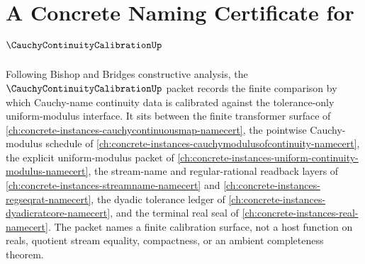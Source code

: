 \chapter{A Concrete Naming Certificate for $\CauchyContinuityCalibrationUp$}
\label{ch:concrete-instances-cauchy-continuity-calibration-namecert}

Following Bishop and Bridges constructive analysis, the $\CauchyContinuityCalibrationUp$ packet records the finite comparison by which Cauchy-name continuity data is calibrated against the tolerance-only uniform-modulus interface. It sits between the finite transformer surface of \autoref{ch:concrete-instances-cauchycontinuousmap-namecert}, the pointwise Cauchy-modulus schedule of \autoref{ch:concrete-instances-cauchymodulusofcontinuity-namecert}, the explicit uniform-modulus packet of \autoref{ch:concrete-instances-uniform-continuity-modulus-namecert}, the stream-name and regular-rational readback layers of \autoref{ch:concrete-instances-streamname-namecert} and \autoref{ch:concrete-instances-regseqrat-namecert}, the dyadic tolerance ledger of \autoref{ch:concrete-instances-dyadicratcore-namecert}, and the terminal real seal of \autoref{ch:concrete-instances-real-namecert}. The packet names a finite calibration surface, not a host function on reals, quotient stream equality, compactness, or an ambient completeness theorem.

